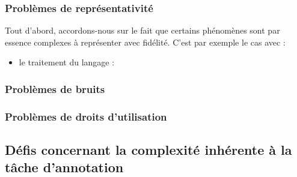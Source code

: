 		
		\subsubsection{Problèmes de représentativité}
		\label{section:2.3.1.A-DEFIS-ANNOTATION-ASPECT-DONNEES-REPRESENTATIVITE}
			
			Tout d'abord, accordons-nous sur le fait que certains phénomènes sont par essence complexes à représenter avec fidélité.
			C'est par exemple le cas avec :
			\begin{itemize}
				\item le traitement du langage :
			\end{itemize}
			
			\begin{leftBarExamples}
			
			\end{leftBarExamples}
			
			
			
			
			
		
			\subsubsection{Problèmes de bruits}
			\label{section:2.3.1.B-DEFIS-ANNOTATION-ASPECT-DONNEES-BRUITS}
			
		
		
			\subsubsection{Problèmes de droits d'utilisation}
			\label{section:2.3.1.C-DEFIS-ANNOTATION-ASPECT-DONNEES-DROITS}
			
		
		
		\subsection{Défis concernant la complexité inhérente à la tâche d'annotation}
		\label{section:2.3.2-DEFIS-ANNOTATION-ASPECT-COMPLEXITE}
		
